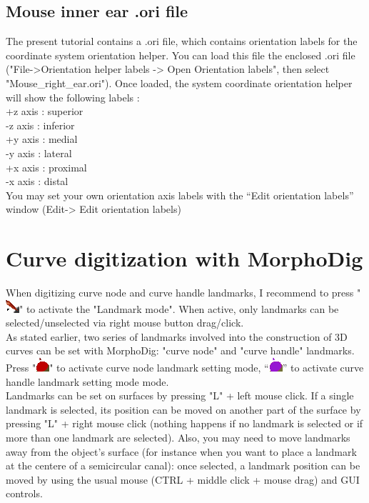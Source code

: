 \documentclass[12pt, a4paper]{book}
\begin{document}
\subsection{Mouse inner ear .ori file}
The present tutorial contains a .ori file, which contains orientation labels for the coordinate system
orientation helper. You can load this file the enclosed .ori file ("File->Orientation helper labels -> Open Orientation labels", then select
"Mouse\_right\_ear.ori"). Once loaded, the system coordinate orientation helper will show the following
labels :\\
+z axis : superior\\
-z axis : inferior\\
+y axis : medial\\
-y axis : lateral\\
+x axis : proximal\\
-x axis : distal\\
You may set your own orientation axis labels with the “Edit orientation labels” window (Edit-> Edit orientation labels)

\section{Curve digitization with MorphoDig}


When digitizing curve node and curve handle landmarks, I recommend to press "\includegraphics[scale=0.7]{../images/04/Landmarks2.png}" to activate the "Landmark mode". When active, only landmarks can be selected/unselected via right mouse button drag/click. \\

As stated earlier, two series of landmarks involved into the construction of 3D curves can be set with MorphoDig: "curve node" and "curve handle" landmarks.
Press "\includegraphics[scale=0.7]{../images/04/curve_nodes.png}" to activate curve node landmark setting mode, “\includegraphics[scale=0.7]{../images/04/curve_handles.png}” to activate curve handle landmark setting mode mode.\\


Landmarks can be set on surfaces by pressing "L" + left mouse click. If a single landmark is selected, its position can be moved
on another part of the surface by pressing "L" + right mouse click (nothing happens if no landmark
is selected or if more than one landmark are selected). Also, you may need to move landmarks away
from the object's surface (for instance when you want to place a landmark at the centere of a semicircular canal):
once selected, a landmark position can be moved by using the usual mouse (CTRL + middle click + mouse drag) and GUI controls.\\
\end{document}
